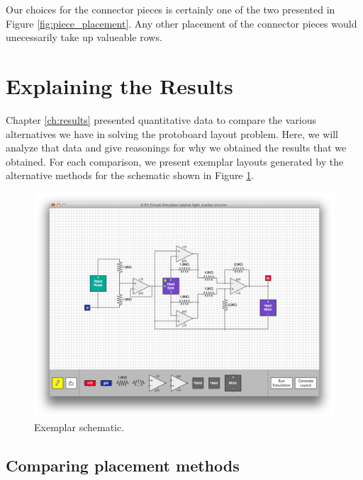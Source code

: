 Our choices for the connector pieces is certainly one of the two presented in
Figure \ref{fig:piece_placement}. Any other placement of the connector pieces
would unecessarily take up valueable rows.

\section{Explaining the Results}

Chapter \ref{ch:results} presented quantitative data to compare the various
alternatives we have in solving the protoboard layout problem. Here, we will
analyze that data and give reasonings for why we obtained the results
that we obtained. For each comparison, we present exemplar layouts generated
by the alternative methods for the schematic shown in Figure
\ref{fig:exemplar_schematic}.

\begin{figure}
\begin{center}
\includegraphics[width=\textwidth]{Images/exemplar_schematic.png}
\caption{Exemplar schematic.}
\label{fig:exemplar_schematic}
\end{center}
\end{figure}

\subsection{Comparing placement methods}

